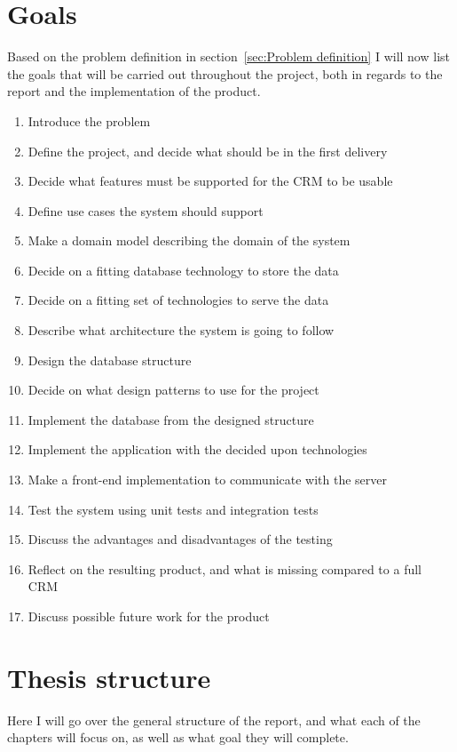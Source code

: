 \section{Goals}
\label{sec:Goals}
Based on the problem definition in section~\ref{sec:Problem definition} I will
now list the goals that will be carried out throughout the project, both in
regards to the report and the implementation of the product. 

\begin{enumerate}
  \item Introduce the problem
  \item Define the project, and decide what should be in the first delivery
  \item Decide what features must be supported for the CRM to be usable
  \item Define use cases the system should support
  \item Make a domain model describing the domain of the system
  \item Decide on a fitting database technology to store the data
  \item Decide on a fitting set of technologies to serve the data
  \item Describe what architecture the system is going to follow
  \item Design the database structure
  \item Decide on what design patterns to use for the project
  \item Implement the database from the designed structure
  \item Implement the application with the decided upon technologies
  \item Make a front-end implementation to communicate with the server
  \item Test the system using unit tests and integration tests
  \item Discuss the advantages and disadvantages of the testing
  \item Reflect on the resulting product, and what is missing compared to a full CRM
  \item Discuss possible future work for the product
\end{enumerate}

\section{Thesis structure}
\label{sec:Thesis structure}
Here I will go over the general structure of the report, and what each of the
chapters will focus on, as well as what goal they will complete.\\ 

